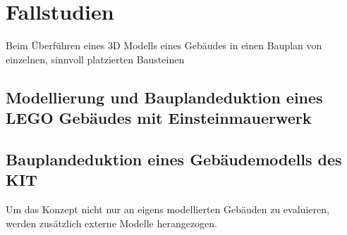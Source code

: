 \chapter{Fallstudien}\label{scenarios}
Beim Überführen eines 3D Modells eines Gebäudes in einen Bauplan von einzelnen, sinnvoll platzierten Bausteinen 
\section{Modellierung und Bauplandeduktion eines LEGO Gebäudes mit Einsteinmauerwerk}
\section{Bauplandeduktion eines Gebäudemodells des KIT}
Um das Konzept nicht nur an eigens modellierten Gebäuden zu evaluieren, werden zusätzlich externe Modelle herangezogen.
